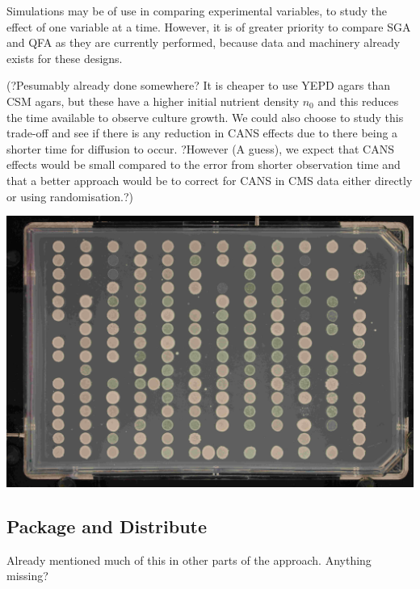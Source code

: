 Simulations may be of use in comparing experimental variables, to study
the effect of one variable at a time. However, it is of greater
priority to compare SGA and QFA as they are currently performed,
because data and machinery already exists for these designs.

(?Pesumably already done somewhere? It is cheaper to use YEPD agars
than CSM agars, but these have a higher initial nutrient density
\(n_{0}\) and this reduces the time available to observe culture
growth. We could also choose to study this trade-off and see if there
is any reduction in CANS effects due to there being a shorter time for
diffusion to occur. ?However (A guess), we expect that CANS effects
would be small compared to the error from shorter observation time and
that a better approach would be to correct for CANS in CMS data either
directly or using randomisation.?)

\begin{Figure}
  \centering
  \includegraphics[width=\linewidth]{K000343_027_001_2015-02-21_19-38-08}
  \label{fig:stripes}
\end{Figure}

\subsection{Package and Distribute}
\label{sec:package-distribute}
Already mentioned much of this in other parts of the
approach. Anything missing?

